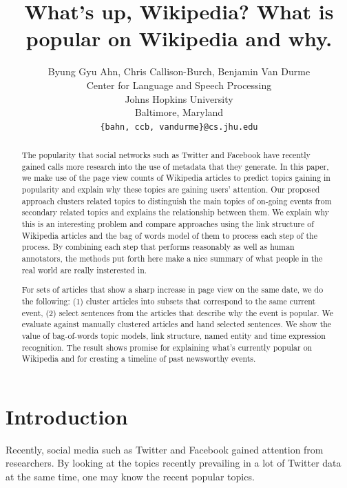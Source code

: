 \documentclass[11pt]{article}
\title{What's up, Wikipedia? What is popular on Wikipedia and why.}
\author{Byung Gyu Ahn, Chris Callison-Burch, Benjamin Van Durme \\
  Center for Language and Speech Processing \\
  Johns Hopkins University \\
  Baltimore, Maryland \\
  {\tt \{bahn, ccb, vandurme\}@cs.jhu.edu} \\}
\date{}
\begin{document}
\maketitle
\begin{abstract}
The popularity that social networks such as Twitter and Facebook have recently gained calls more research into the use of metadata that they generate. In this paper, we make use of the page view counts of Wikipedia articles to predict topics gaining in popularity and explain why these topics are gaining users' attention. Our proposed approach clusters related topics to distinguish the main topics of on-going events from secondary related topics and explains the relationship between them. We explain why this is an interesting problem and compare approaches using the link structure of Wikipedia articles and the bag of words model of them to process each step of the process. By combining each step that performs reasonably as well as human annotators, the methods put forth here make a nice summary of what people in the real world are really insterested in.

For sets of articles that show a sharp increase in page view on the same date, we do the following:
(1) cluster articles into subsets that correspond to the same current event, (2) select sentences from the articles that describe why the event is popular.
We evaluate against manually clustered articles and hand selected sentences.
We show the value of bag-of-words topic models, link structure, named entity and time expression recognition.
The result shows promise for explaining what's currently popular on Wikipedia and for creating a timeline of past newsworthy events.

\end{abstract}

\section{Introduction}

Recently, social media such as Twitter and Facebook gained attention from researchers.
By looking at the topics recently prevailing in a lot of Twitter data at the same time, one may know the recent popular topics.

\end{document}
